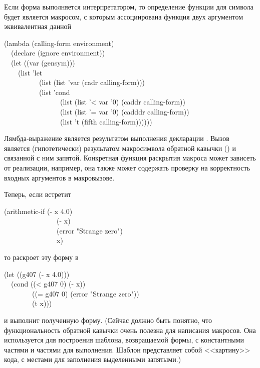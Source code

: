 \begin{defmac}
Если форма выполняется интерпретатором, то определение функции для символа
 будет является макросом, с которым ассоциирована функция двух
аргументом эквивалентная данной
\begin{lisp}
(lambda (calling-form environment) \\
~~(declare (ignore environment)) \\
~~(let ((var (gensym))) \\
~~~~(list 'let \\
~~~~~~~~~~(list (list 'var (cadr calling-form))) \\
~~~~~~~~~~(list 'cond \\
~~~~~~~~~~~~~~~~(list (list '< var '0) (caddr calling-form)) \\
~~~~~~~~~~~~~~~~(list (list '= var '0) (cadddr calling-form)) \\
~~~~~~~~~~~~~~~~(list 't (fifth calling-form))))))
\end{lisp}
Лямбда-выражение является результатом выполнения декларации .
Вызов  является (гипотетически) результатом макросимвола обратной
кавычки (\cd{{\Xbq}}) и связанной с ним запятой.
Конкретная функция раскрытия макроса может зависеть от реализации, например, она
также может содержать проверку на корректность входных аргументов в макровызове.

Теперь, если  встретит
\begin{lisp}
(arithmetic-if (- x 4.0) \\
~~~~~~~~~~~~~~~(- x) \\
~~~~~~~~~~~~~~~(error "Strange zero") \\
~~~~~~~~~~~~~~~x)
\end{lisp}
то раскроет эту форму в
\begin{lisp}
(let ((g407 (- x 4.0))) \\
~~(cond ((< g407 0) (- x)) \\
~~~~~~~~((= g407 0) (error "Strange zero")) \\
~~~~~~~~(t x)))
\end{lisp}
и  выполнит полученную форму.
(Сейчас должно быть понятно, что функциональность обратной кавычки очень полезна
для написания макросов. Она используется для построения шаблона, возвращаемой
формы, с константными частями и частями для выполнения. Шаблон представляет
собой <<картину>> кода, с местами для заполнения выделенными запятыми.)


\end{defmac}

